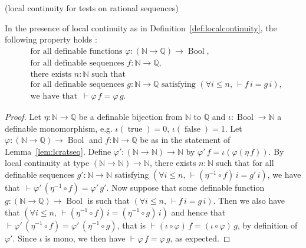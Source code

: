 \documentclass[envcountsame]{llncs}
\newcommand{\N}{\mathbb{N}}
\newcommand{\Q}{\mathbb{Q}}
\DeclareMathOperator{\Bool}{Bool}
\DeclareMathOperator{\true}{true}
\DeclareMathOperator{\false}{false}
\newcommand{\fad}{\text{for all definable }}
\begin{document}
\begin{lemma}(local continuity for tests on rational sequences)
\label{lem:lcratseq}

In the presence of local continuity as in Definition~\ref{def:localcontinuity}, the following property holds :
\begin{align*}
   &\fad\text{functions }\varphi \colon (\N \to \Q) \to \Bool,\\
   &\fad\text{sequences }f  \colon  \N \to \Q,\\
   &\text{there exists }  n:\N\text{ such that }\\
   &\fad\text{sequences } g  \colon  \N \to \Q \text{ satisfying } (\forall i\leq n,\, \vdash f\,i = g\,i),\\
   &\text{we have that }{\,\vdash \varphi\, f} = \varphi\, g.
\end{align*}
\end{lemma}
\begin{proof}
Let $\eta\colon \N\to\Q$ be a definable bijection from $\N$ to $\Q$ and $\iota\colon\Bool\to\N$ a definable monomorphism, e.g. $\iota(\true)=0$, $\iota(\false)=1$. Let $\varphi\colon (\N \to \Q) \to \Bool$ and $f  \colon  \N \to \Q$ be as in the statement of Lemma~\ref{lem:lcratseq}.
Define $\varphi'\colon (\N\to\N)\to\N$ by $\varphi'\,f=\iota(\varphi(\eta\,f))$. By local continuity at type $(\N\to\N)\to\N$, there exists $n:\N$ such that for all definable sequences $g'\colon\N\to\N$ satisfying $(\forall i\leq n,\, \vdash (\eta^{-1}\circ f)\,i = g'\,i)$, we have that $\,\vdash\varphi'\,(\eta^{-1}\circ f) = \varphi'\,g'$. Now suppose that some definable function $g\colon(\N\to\Q)\to\Bool$ is
such that $(\forall i\leq n,\, \vdash f\,i = g\,i)$. Then we also have that $(\forall i\leq n,\, \vdash (\eta^{-1}\circ f)\,i = (\eta^{-1}\circ g)\,i)$ and hence that $\vdash\varphi'\,(\eta^{-1}\circ f) = \varphi'\,(\eta^{-1}\circ g)$,
that is $\vdash(\iota\circ \varphi)\,f = (\iota\circ \varphi)\,g$, by definition of $\varphi'$. Since $\iota$ is mono, we then have $\vdash \varphi\,f=\varphi\,g$, as expected.
\end{proof}
\end{document}
